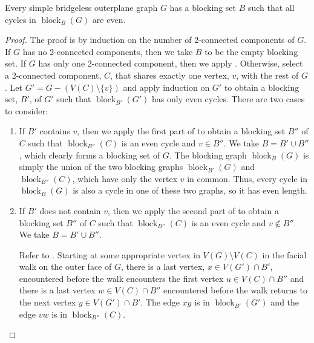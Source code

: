 \documentclass{patmorin}
\DeclareMathOperator{\block}{block}
\begin{document}
\begin{lem}
  Every simple bridgeless outerplane graph $G$ has a blocking set $B$
  such that all cycles in $\block_B(G)$ are even.
\end{lem}

\begin{proof}
  The proof is by induction on the number of 2-connected components
  of $G$.  If $G$ has no 2-connected components, then we take $B$ to be
  the empty blocking set.  If $G$ has only one 2-connected component,
  then we apply .
  Otherwise, select a 2-connected component, $C$, that
  shares exactly one vertex, $v$, with the rest of $G$.  Let
  $G'=G-(V(C)\setminus\{v\})$ and apply induction on $G'$
  to obtain a blocking set, $B'$, of $G'$ such that $\block_{B'}(G')$
  has only even cycles.  There are two cases to consider:
  \begin{enumerate}
    \item If $B'$ contains $v$, then we apply the first part of
     to obtain a blocking set $B''$ of $C$
    such that $\block_{B''}(C)$ is an even cycle and $v\in B''$.  We take
    $B=B'\cup B''$, which clearly forms a blocking set of $G$.  
    The blocking graph $\block_B(G)$ is simply the union of the
    two blocking graphs $\block_{B'}(G)$ and $\block_{B''}(C)$, which have
    only the vertex $v$ in common.  Thus, every cycle in $\block_B(G)$
    is also a cycle in one of these two graphs, so it has even length.

    \item If $B'$ does not contain $v$, then we apply the second part
    of  to obtain a blocking set $B''$ of $C$
    such that $\block_{B''}(C)$ is an even cycle and $v\not\in B''$.
    We take $B=B'\cup B''$.

    Refer to .  
    Starting at some appropriate vertex in $V(G)\setminus V(C)$
    in the facial walk on the outer face of $G$, there is a last vertex,
    $x\in V(G')\cap B'$, encountered before the walk encounters the first
    vertex $u\in V(C)\cap B''$ and there is a last vertex $w\in V(C)\cap
    B''$ encountered before the walk returns to the next vertex $y\in
    V(G')\cap B'$.  The edge $xy$ is in $\block_{B'}(G')$ and the edge
    $vw$ is in $\block_{B''}(C)$.


\end{enumerate}
\end{proof}
\end{document}
